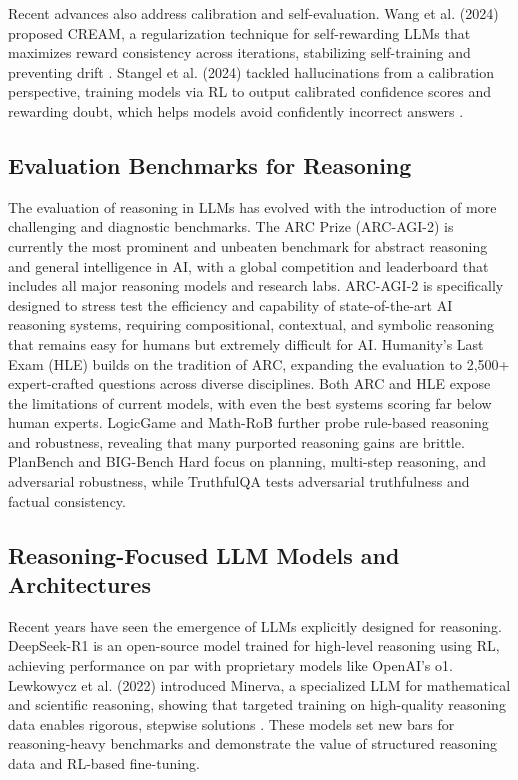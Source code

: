 Recent advances also address calibration and self-evaluation. Wang et al. (2024) proposed CREAM, a regularization technique for self-rewarding LLMs that maximizes reward consistency across iterations, stabilizing self-training and preventing drift \citep{wang2024}. Stangel et al. (2024) tackled hallucinations from a calibration perspective, training models via RL to output calibrated confidence scores and rewarding doubt, which helps models avoid confidently incorrect answers \citep{stangel2024}.

\subsection{Evaluation Benchmarks for Reasoning}

The evaluation of reasoning in LLMs has evolved with the introduction of more challenging and diagnostic benchmarks. The ARC Prize (ARC-AGI-2) \citep{chollet2024} is currently the most prominent and unbeaten benchmark for abstract reasoning and general intelligence in AI, with a global competition and leaderboard that includes all major reasoning models and research labs. ARC-AGI-2 is specifically designed to stress test the efficiency and capability of state-of-the-art AI reasoning systems, requiring compositional, contextual, and symbolic reasoning that remains easy for humans but extremely difficult for AI. Humanity's Last Exam (HLE) \citep{phan2025} builds on the tradition of ARC, expanding the evaluation to 2,500+ expert-crafted questions across diverse disciplines. Both ARC and HLE expose the limitations of current models, with even the best systems scoring far below human experts. LogicGame \citep{gui2024} and Math-RoB \citep{yu2024} further probe rule-based reasoning and robustness, revealing that many purported reasoning gains are brittle. PlanBench \citep{valmeekam2023} and BIG-Bench Hard \citep{srivastava2022} focus on planning, multi-step reasoning, and adversarial robustness, while TruthfulQA \citep{lin2022} tests adversarial truthfulness and factual consistency.

\subsection{Reasoning-Focused LLM Models and Architectures}

Recent years have seen the emergence of LLMs explicitly designed for reasoning. DeepSeek-R1 \citep{liang2025} is an open-source model trained for high-level reasoning using RL, achieving performance on par with proprietary models like OpenAI's o1. Lewkowycz et al. (2022) introduced Minerva, a specialized LLM for mathematical and scientific reasoning, showing that targeted training on high-quality reasoning data enables rigorous, stepwise solutions \citep{lewkowycz2022}. These models set new bars for reasoning-heavy benchmarks and demonstrate the value of structured reasoning data and RL-based fine-tuning.


